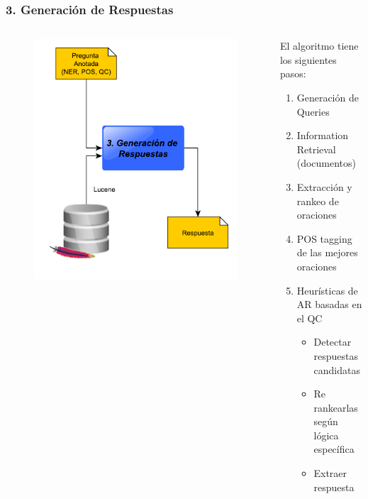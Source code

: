 \begin{frame}[<+->]
\frametitle{3. Generación de Respuestas}
  \begin{columns}[T] %
\begin{column}{.38\textwidth}
      \begin{figure}
          \includegraphics[scale=0.3]{graficos/pipeline-ar}
      \end{figure}
\end{column}%
\hfill%
\begin{column}{.58\textwidth}
El algoritmo tiene los siguientes pasos:
  \begin{enumerate}
    \item Generación de Queries
    \item Information Retrieval (documentos)
    \item Extracción y rankeo de oraciones
    \item POS tagging de las mejores oraciones
    \item Heurísticas de AR basadas en el QC
    \begin{itemize}
      \item \fontsize{8.5pt}{7.2}\selectfont Detectar respuestas candidatas
      \item \fontsize{8.5pt}{7.2}\selectfont Re rankearlas según lógica específica
      \item \fontsize{8.5pt}{7.2}\selectfont Extraer respuesta
    \end{itemize}
  \end{enumerate}
\end{column}%
\end{columns}
\end{frame}


